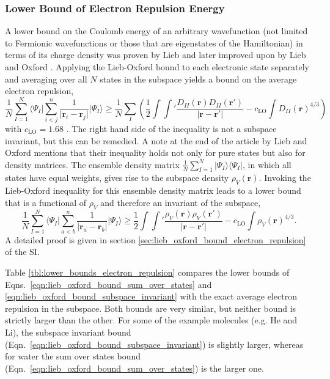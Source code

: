 \documentclass[journal=jpclcd,manuscript=letter]{achemso}
\renewcommand\vec[1]{\mathbf{#1}}
\begin{document}
\subsubsection{Lower Bound of Electron Repulsion Energy}
A lower bound on the Coulomb energy of an arbitrary wavefunction
(not limited to Fermionic wavefunctions or those that are eigenstates of the Hamiltonian) in terms of
its charge density was proven by Lieb \cite{Lieb1979} and later improved upon by Lieb and Oxford \cite{Lieb1981}.
Applying the Lieb-Oxford bound to each electronic state separately and averaging over all $N$ states in the subspace
yields a bound on the average electron repulsion,
\begin{equation}
\frac{1}{N} \sum_{I=1}^{N} \langle \Psi_{I} \vert \sum_{i < j}^{n} \frac{1}{\vert \vec{r}_i - \vec{r}_j \vert} \vert \Psi_{I} \rangle
\geq \frac{1}{N} \sum_{I} \left( \frac{1}{2} \int \int' \frac{D_{II}(\vec{r}) D_{II}(\vec{r}')}{\vert \vec{r} - \vec{r}' \vert}
 - c_{\text{LO}} \int D_{II}(\vec{r})^{4/3} \right) \label{eqn:lieb_oxford_bound_sum_over_states} 
\end{equation}
with $c_{\text{LO}} = 1.68$ \cite{Lieb1981}. The right hand side of the inequality is not a subspace invariant, but this can be
remedied. A note at the end of the article by Lieb and Oxford \cite{Lieb1981} mentions that their inequality holds not only for pure states
but also for density matrices. The ensemble density matrix $\frac{1}{N} \sum_{I=1}^{N} \vert \Psi_I \rangle \langle \Psi_I \vert$, in which all
states have equal weights, gives rise to the subspace density $\rho_V(\vec{r})$. Invoking the Lieb-Oxford inequality for this ensemble
density matrix leads to a lower bound that is a functional of $\rho_V$ and therefore an invariant of the subspace,
\begin{equation}
  \frac{1}{N} \sum_{I=1}^{N} \langle \Psi_{I} \vert \sum_{a < b}^{n} \frac{1}{\vert \vec{r}_a - \vec{r}_b \vert} \vert \Psi_{I} \rangle
  \geq \frac{1}{2} \int \int' \frac{\rho_V(\vec{r}) \rho_V(\vec{r}')}{\vert \vec{r} - \vec{r}' \vert}
   - c_{\text{LO}} \int \rho_V(\vec{r})^{4/3}. \label{eqn:lieb_oxford_bound_subspace_invariant} 
\end{equation}
A detailed proof is given in section \ref{sec:lieb_oxford_bound_electron_repulsion} of the SI.

Table \ref{tbl:lower_bounds_electron_repulsion} compares the lower bounds of Eqns.~\ref{eqn:lieb_oxford_bound_sum_over_states} and
\ref{eqn:lieb_oxford_bound_subspace_invariant} with the exact average electron repulsion in the subspace. Both bounds are very similar,
but neither bound is strictly larger than the other. For some of the example molecules (e.g. He and Li), the subspace invariant
bound (Eqn.~\ref{eqn:lieb_oxford_bound_subspace_invariant}) is slightly larger,
whereas for water the sum over states bound (Eqn.~\ref{eqn:lieb_oxford_bound_sum_over_states}) is the larger one.
\end{document}
